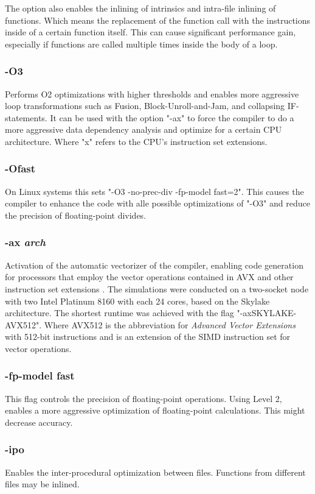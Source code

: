 The option also enables the inlining of intrinsics and intra-file inlining of functions. Which means the replacement of the function call with the instructions inside of a certain function itself. This can cause significant performance gain, especially if functions are called multiple times inside the body of a loop.

\subsubsection*{-O3}
Performs O2 optimizations with higher thresholds and enables more aggressive loop transformations such as Fusion, Block-Unroll-and-Jam, and collapsing IF-statements. It can be used with the option "-ax" to force the compiler to do a more aggressive data dependency analysis and optimize for a certain CPU architecture. Where "x" refers to the CPU's instruction set extensions.

\subsubsection*{-Ofast}
On Linux systems this sets "-O3 -no-prec-div -fp-model fast=2". This causes the compiler to enhance the code with alle possible optimizations of "-O3" and reduce the precision of floating-point divides.

\subsubsection*{-ax \textit{arch}}
Activation of the automatic vectorizer of the compiler, enabling code generation for processors that employ the vector operations contained in AVX and other instruction set extensions . The simulations were conducted on a two-socket node with two Intel Platinum 8160 with each 24 cores, based on the Skylake architecture. The shortest runtime was achieved with the flag "-axSKYLAKE-AVX512". Where AVX512 is the abbreviation for \textit{Advanced Vector Extensions} with 512-bit instructions and is an extension of the SIMD instruction set for vector operations. 

\subsubsection*{-fp-model fast}
This flag controls the precision of floating-point operations. Using Level 2, enables a more aggressive optimization of floating-point calculations. This might decrease accuracy.

\subsubsection*{-ipo}
Enables the inter-procedural optimization between files. Functions from different files may be inlined.

